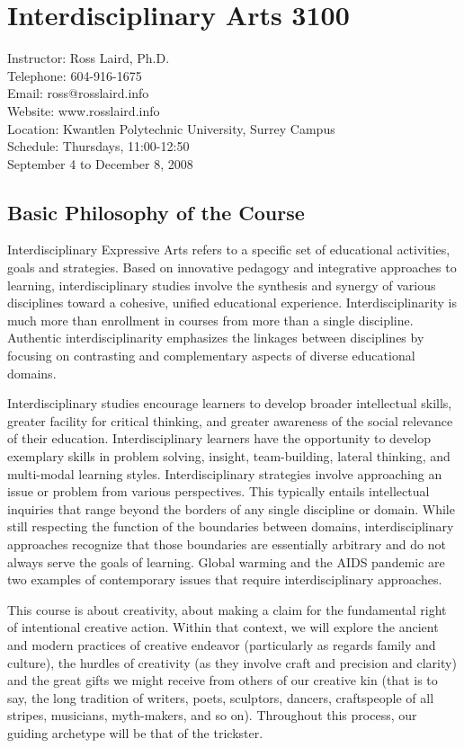 \documentclass[10pt,DIV09,letterpaper,oneside,headsepline]{scrreprt}
\begin{document}
\chapter{Interdisciplinary Arts 3100}
Instructor: Ross Laird, Ph.D.\\ 
Telephone: 604-916-1675\\
Email: ross@rosslaird.info\\
Website: www.rosslaird.info\\
Location: Kwantlen Polytechnic University, Surrey Campus\\
Schedule: Thursdays, 11:00-12:50\\
September 4 to December 8, 2008\\

\section{Basic Philosophy of the Course}

Interdisciplinary Expressive Arts refers to a specific set of educational activities, goals and strategies. Based on innovative pedagogy and integrative approaches to learning, interdisciplinary studies involve the synthesis and synergy of various disciplines toward a cohesive, unified educational experience. Interdisciplinarity is much more than enrollment in courses from more than a single discipline. Authentic interdisciplinarity emphasizes the linkages between disciplines by focusing on contrasting and complementary aspects of diverse educational domains.

Interdisciplinary studies encourage learners to develop broader intellectual skills, greater facility for critical thinking, and greater awareness of the social relevance of their education. Interdisciplinary learners have the opportunity to develop exemplary skills in problem solving, insight, team-building, lateral thinking, and multi-modal learning styles. Interdisciplinary strategies involve approaching an issue or problem from various perspectives. This typically entails intellectual inquiries that range beyond the borders of any single discipline or domain. While still respecting the function of the boundaries between domains, interdisciplinary approaches recognize that those boundaries are essentially arbitrary and do not always serve the goals of learning. Global warming and the AIDS pandemic are two examples of contemporary issues that require interdisciplinary approaches. 

This course is about creativity, about making a claim for the fundamental right of intentional creative action. Within that context, we will explore the ancient and modern practices of creative endeavor (particularly as regards family and culture), the hurdles of creativity (as they involve craft and precision and clarity) and the great gifts we might receive from others of our creative kin (that is to say, the long tradition of writers, poets, sculptors, dancers, craftspeople of all stripes, musicians, myth-makers, and so on). Throughout this process, our guiding archetype will be that of the trickster.
\end{document}
